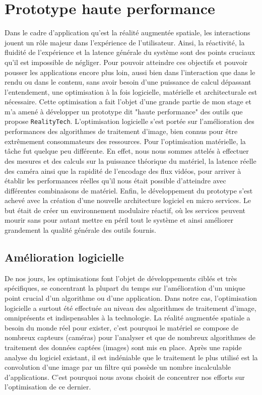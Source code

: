 \chapter{Prototype haute performance}
\label{chap:protoHP}

Dans le cadre d'application qu'est la réalité augmentée spatiale, les interactions jouent un rôle majeur dans l'expérience de l'utilisateur. Ainsi, la réactivité, la fluidité de l'expérience et la latence générale du système sont des points cruciaux qu'il est impossible de négliger. Pour pouvoir atteindre ces objectifs et pouvoir pousser les applications encore plus loin, aussi bien dans l'interaction que dans le rendu ou dans le contenu, sans avoir besoin d'une puissance de calcul dépassant l'entendement, une optimisation à la fois logicielle, matérielle et architecturale est nécessaire. 
Cette optimisation a fait l'objet d'une grande partie de mon stage et m'a amené à développer un prototype dit "haute performance" des outils que propose \texttt{RealityTech}. L'optimisation logicielle s'est portée sur l'amélioration des performances des algorithmes de traitement d'image, bien connus pour être extrêmement consommateurs des ressources. Pour l'optimisation matérielle, la tâche fut quelque peu différente. En effet, nous nous sommes attelés à effectuer des mesures et des calculs sur la puissance théorique du matériel, la latence réelle des caméra ainsi que la rapidité de l'encodage des flux vidéos, pour arriver à établir les performances réelles qu'il nous était possible d'atteindre avec différentes combinaisons de matériel. Enfin, le développement du prototype s'est achevé avec la création d'une nouvelle architecture logiciel en micro services\cite{dmitry2014micro}. Le but était de créer un environnement modulaire réactif, où les services peuvent mourir sans pour autant mettre en péril tout le système et ainsi améliorer grandement la qualité générale des outils fournis.

\section{Amélioration logicielle}
\label{sec:hpsoft}
De nos jours, les optimisations font l'objet de développements ciblés et très spécifiques, se concentrant la plupart du temps sur l'amélioration d'un unique point crucial d'un algorithme ou d'une application. Dans notre cas, l'optimisation logicielle a surtout été effectuée au niveau des algorithmes de traitement d'image, omniprésents et indispensables à la technologie. La réalité augmentée spatiale a besoin du monde réel pour exister, c'est pourquoi le matériel se compose de nombreux capteurs (caméras) pour l'analyser et que de nombreux algorithmes de traitement des données captées (images) sont mis en place. 
Après une rapide analyse du logiciel existant, il est indéniable que le traitement le plus utilisé est la convolution d'une image par un filtre qui possède un nombre incalculable d'applications. C'est pourquoi nous avons choisit de concentrer nos efforts sur l'optimisation de ce dernier.

